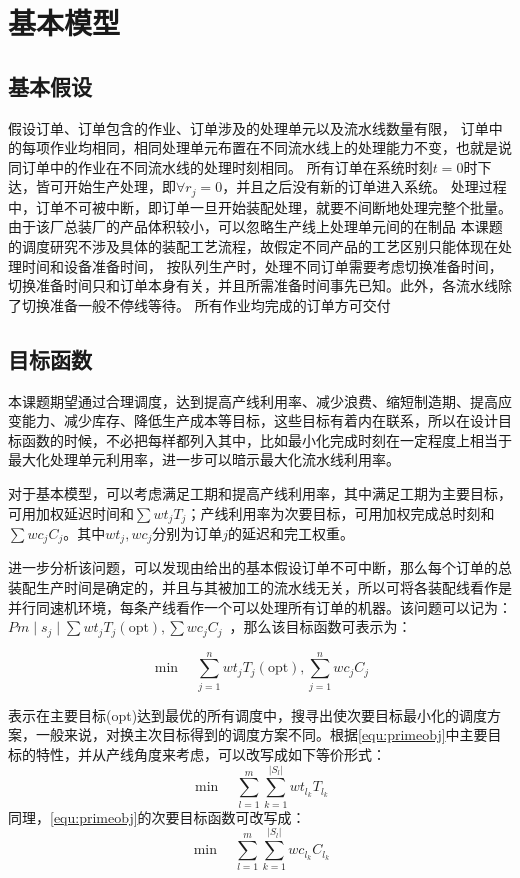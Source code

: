 \section{基本模型}
\subsection{基本假设}
假设订单、订单包含的作业、订单涉及的处理单元以及流水线数量有限，
订单中的每项作业均相同，相同处理单元布置在不同流水线上的处理能力不变，也就是说同订单中的作业在不同流水线的处理时刻相同。
所有订单在系统时刻$t = 0$时下达，皆可开始生产处理，即$\forall r_j =0$，并且之后没有新的订单进入系统。
处理过程中，订单不可被中断，即订单一旦开始装配处理，就要不间断地处理完整个批量。
由于该厂总装厂的产品体积较小，可以忽略生产线上处理单元间的在制品
本课题的调度研究不涉及具体的装配工艺流程，故假定不同产品的工艺区别只能体现在处理时间和设备准备时间，
按队列生产时，处理不同订单需要考虑切换准备时间，切换准备时间只和订单本身有关，并且所需准备时间事先已知。此外，各流水线除了切换准备一般不停线等待。
所有作业均完成的订单方可交付

\subsection{目标函数}
本课题期望通过合理调度，达到提高产线利用率、减少浪费、缩短制造期、提高应变能力、减少库存、降低生产成本等目标，这些目标有着内在联系，所以在设计目标函数的时候，不必把每样都列入其中，比如最小化完成时刻在一定程度上相当于最大化处理单元利用率，进一步可以暗示最大化流水线利用率。

对于基本模型，可以考虑满足工期和提高产线利用率，其中满足工期为主要目标，可用加权延迟时间和$\sum wt_jT_j$；产线利用率为次要目标，可用加权完成总时刻和$\sum wc_jC_j$。其中$wt_j, wc_j$分别为订单$j$的延迟和完工权重。

进一步分析该问题，可以发现由给出的基本假设订单不可中断，那么每个订单的总装配生产时间是确定的，并且与其被加工的流水线无关，所以可将各装配线看作是并行同速机环境，每条产线看作一个可以处理所有订单的机器。该问题可以记为：$Pm \mid s_j\mid\sum wt_jT_j(\text{opt}), \sum wc_jC_j$\ ，那么该目标函数可表示为：

\begin{equation}
\min\quad \sum_{j = 1}^n wt_jT_j(\text{opt}), \sum_{j=1}^n wc_jC_j
\label{equ:primeobj}
\end{equation}

表示在主要目标(opt)达到最优的所有调度中，搜寻出使次要目标最小化的调度方案，一般来说，对换主次目标得到的调度方案不同。根据\eqref{equ:primeobj}中主要目标的特性，并从产线角度来考虑，可以改写成如下等价形式：
\begin{equation}
\min\quad \sum_{l=1}^m\sum_{k=1}^{|S_l|} wt_{l_k}T_{l_k}
\label{equ:objmain}
\end{equation}
同理，\eqref{equ:primeobj}的次要目标函数可改写成：
\begin{equation}
\min\quad \sum_{l=1}^m\sum_{k=1}^{|S_l|}wc_{l_k}C_{l_k}\label{equ:objsecond}
\end{equation}
